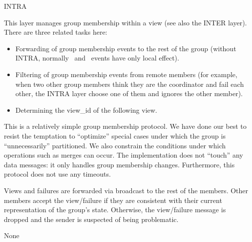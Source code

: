 \begin{Layer}{INTRA}

This layer manages group membership within a view (see also the INTER layer).
There are three related tasks here:
\begin{itemize}
\item
Forwarding of group membership events to the rest of the group
(without INTRA, normally \DnView\ and \DnFail\ events have only local
effect).
\item 
Filtering of group membership events from remote members (for
example, when two other group members think they are the coordinator
and fail each other, the INTRA layer choose one of them and ignores
the other member).
\item
Determining the view\_id of the following view.
\end{itemize}

\begin{Protocol}
This is a relatively simple group membership protocol.  We have done our
best to resist the temptation to ``optimize'' special cases under which the
group is ``unnecessarily'' partitioned.  We also constrain the conditions
under which operations such as merges can occur.  The implementation does
not ``touch'' any data messages: it only handles group membership changes.
Furthermore, this protocol does not use any timeouts.

Views and failures are forwarded via broadcast to the rest of the members.
Other members accept the view/failure if they are consistent with their
current representation of the group's state.  Otherwise, the view/failure
message is dropped and the sender is suspected of being problematic. 
\end{Protocol}

\begin{Parameters}
\item None
\end{Parameters}


\end{Layer}
